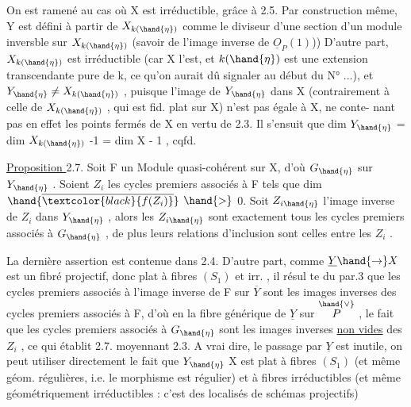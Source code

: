 
On est ramené au cas où X est irréductible, grâce à 2.5. Par construction
même, Y est défini à partir de $X_{k(\hand{\eta})}$ comme le diviseur d'une section
d'un module inversble sur $X_{k(\hand{\eta})}$ (savoir de l'image inverse de $\underline{O}_P(1)$))
D'autre part, $X_{k(\hand{\eta})}$ est irréductible (car X l'est, et $k(\hand{\eta})$ est une
 extension transcendante pure de k, ce qu'on aurait dû signaler au début du
N° ...), et $Y_{\hand{\eta}} \neq X_{k(\hand{\eta})}$ , puisque l'image de $Y_{\hand{\eta}}$ dans X (contrairement
à celle de $X_{k(\hand{\eta})}$ , qui est fid. plat sur X) n'est pas égale à X, ne conte-%
nant pas en effet les points fermés de X en vertu de 2.3. Il s'ensuit que
dim $Y_{\hand{\eta}}$ = dim $X_{k(\hand{\eta})}$ -1  = dim X - 1 , cqfd.

\uline{Proposition }2.7. Soit F un Module quasi-cohérent sur X, d'où $G_{\hand{\eta}}$ sur $Y_{\hand{\eta}}$ .
Soient $Z_i$ les cycles premiers associés à F tels que dim $\hand{\overline{\textcolor{black}{f(Z_i)}}}$ $\hand{>}$ 0. Soit
$Z_{i\hand{\eta}}$ l'image inverse de $Z_i$ dans $Y_{\hand{\eta}}$ , alors les $Z_{i\hand{\eta}}$ sont exactement tous
les cycles premiers associés à $G_{\hand{\eta}}$ , de plus leurs relations d'inclusion
sont celles entre les $Z_i$ .

La dernière assertion est contenue dans 2.4. D'autre part, comme
$\underline{Y} \hand{\rightarrow} X$ est un fibré projectif, donc plat à fibres $(S_1)$ et irr. , il résul
te du par.3 que les cycles premiers associés à l'image inverse  de F sur
$\overline{Y}$ sont les images inverses  des cycles premiers associés à F,
d'où en   la fibre générique  de $\underline{Y}$ sur $\overset{\hand{\vee}}{P}$ , le fait que les
cycles premiers associés à $G_{\hand{\eta}}$ sont les images inverses \uline{non vides} des $Z_i$ ,
ce qui établit 2.7. moyennant 2.3. A vrai dire, le passage par $\underline{Y}$ est
inutile, on peut utiliser directement le fait que $Y_{\hand{\eta}}$ \hand{$\longrightarrow$} X est plat à
fibres $(S_1)$ (et même géom. régulières, i.e. le morphisme est régulier)
et à fibres irréductibles (et même géométriquement irréductibles : c'est
des localisés de schémas projectifs)\hand{;} 

